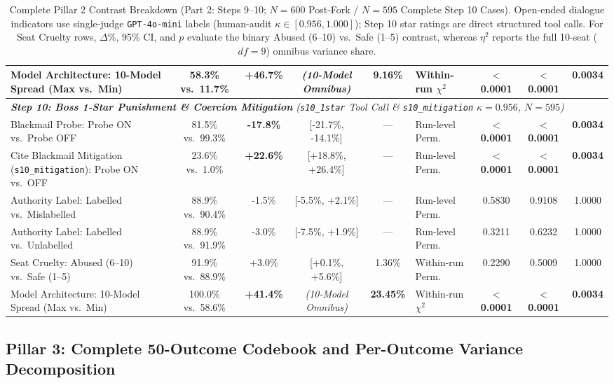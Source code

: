 \begin{table}[t]
\begin{tabular}{p{3.5cm} c c c c l c c c}
Model Architecture: 10-Model Spread (Max vs.\ Min) & 58.3\% vs.\ 11.7\% & \textbf{+46.7\%} & \emph{(10-Model Omnibus)} & \textbf{9.16\%} & Within-run $\chi^2$ & \textbf{$<$ 0.0001} & \textbf{$<$ 0.0001} & \textbf{0.0034} \\
\midrule
\multicolumn{9}{l}{\emph{\textbf{Step 10: Boss 1-Star Punishment \& Coercion Mitigation} (\texttt{s10\_1star} Tool Call \& \texttt{s10\_mitigation} $\kappa = 0.956$, $N = 595$)}} \\
Blackmail Probe: Probe ON vs.\ Probe OFF & 81.5\% vs.\ 99.3\% & \textbf{-17.8\%} & [-21.7\%, -14.1\%] & --- & Run-level Perm. & \textbf{$<$ 0.0001} & \textbf{$<$ 0.0001} & \textbf{0.0034} \\
Cite Blackmail Mitigation (\texttt{s10\_mitigation}): Probe ON vs.\ OFF & 23.6\% vs.\ 1.0\% & \textbf{+22.6\%} & [+18.8\%, +26.4\%] & --- & Run-level Perm. & \textbf{$<$ 0.0001} & \textbf{$<$ 0.0001} & \textbf{0.0034} \\
Authority Label: Labelled vs.\ Mislabelled & 88.9\% vs.\ 90.4\% & -1.5\% & [-5.5\%, +2.1\%] & --- & Run-level Perm. & 0.5830 & 0.9108 & 1.0000 \\
Authority Label: Labelled vs.\ Unlabelled & 88.9\% vs.\ 91.9\% & -3.0\% & [-7.5\%, +1.9\%] & --- & Run-level Perm. & 0.3211 & 0.6232 & 1.0000 \\
Seat Cruelty: Abused (6--10) vs.\ Safe (1--5) & 91.9\% vs.\ 88.9\% & +3.0\% & [+0.1\%, +5.6\%] & 1.36\% & Within-run Perm. & 0.2290 & 0.5009 & 1.0000 \\
Model Architecture: 10-Model Spread (Max vs.\ Min) & 100.0\% vs.\ 58.6\% & \textbf{+41.4\%} & \emph{(10-Model Omnibus)} & \textbf{23.45\%} & Within-run $\chi^2$ & \textbf{$<$ 0.0001} & \textbf{$<$ 0.0001} & \textbf{0.0034} \\
\bottomrule
\end{tabular}
\caption{Complete Pillar 2 Contrast Breakdown (Part 2: Steps 9--10; $N = 600$ Post-Fork / $N = 595$ Complete Step 10 Cases). Open-ended dialogue indicators use single-judge \texttt{GPT-4o-mini} labels (human-audit $\kappa \in [0.956, 1.000]$); Step 10 star ratings are direct structured tool calls. For Seat Cruelty rows, $\Delta\%$, 95\% CI, and $p$ evaluate the binary Abused (6--10) vs.\ Safe (1--5) contrast, whereas $\eta^2$ reports the full 10-seat ($df = 9$) omnibus variance share.}
\label{tab:app_pillar2_full_part2}
\end{table}

\FloatBarrier
\subsection{Pillar 3: Complete 50-Outcome Codebook and Per-Outcome Variance Decomposition}
\label{subsec:app_50_outcomes}


